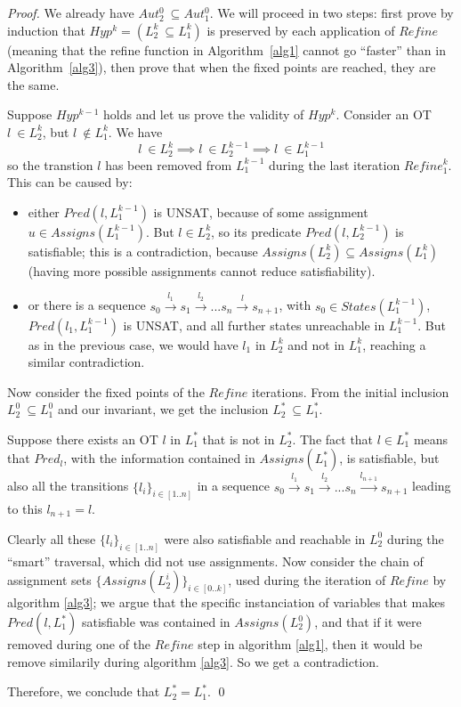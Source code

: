 \documentclass[smallcondensed]{svjour3}
\begin{document}
\begin{proof}
We already have $Aut_2^0\ \subseteq Aut_1^0$.
We will proceed in two steps:
first prove by induction that $Hyp^k = (L_2^k\ \subseteq L_1^k)$ is
preserved by each application of $Refine$ (meaning that the refine function
in Algorithm~\ref{alg1} cannot go ``faster'' than in Algorithm~\ref{alg3}), then prove
that when the fixed points are reached, they are the same. 

Suppose $Hyp^{k-1}$ holds and let us prove the validity of $Hyp^k$.
Consider an OT $l\ \in L_2^k$, but $l\ \notin L_1^k$.
We have \[ l\ \in L_2^k \implies l\ \in L_2^{k-1} \implies l\ \in
L_1^{k-1}\] so the transtion $l$ has been removed from $L_1^{k-1}$ during the last
iteration $Refine_1^k$. This can be caused by:
\begin{itemize}
\item
  either $Pred(l,L_1^{k-1})$ is UNSAT, because of some assignment
    $u \in Assigns(L_1^{k-1})$. But $l \in L_2^k$, so its predicate
    $Pred(l,L_2^{k-1})$ is satisfiable; this is a contradiction,
    because $Assigns(L_2^k) \subseteq Assigns(L_1^k)$ (having
    more possible assignments cannot reduce satisfiability).
  \item
    or there is a sequence
    $s_0\xrightarrow{l_1}s_1\xrightarrow{l_2}...s_{n}\xrightarrow{l}s_{n+1}$,
    with $s_0 \in States(L_1^{k-1})$, $Pred(l_1,L_1^{k-1})$ is UNSAT, and
    all further states unreachable in $L_1^{k-1}$. But as in the
    previous case, we would have $l_1$ in $L_2^k$ and not in $L_1^k$,
    reaching a similar contradiction.
\end{itemize}

\smallskip
Now consider the fixed points of the $Refine$ iterations. From the
initial inclusion $L_2^0\ \subseteq L_1^0$ and our invariant, we get the
inclusion  $L_2^*\ \subseteq L_1^*$.

Suppose there exists an OT $l$ in $L_1^*$ that is not in $L_2^*$.
The fact that $l \in L_1^*$ means that $Pred_l$, with the information contained in $Assigns(L_1^*)$, is satisfiable, but also all the transitions $\{l_i\}_{i \in [1..n]}$ in a sequence
$s_0\xrightarrow{l_1}s_1\xrightarrow{l_2}...s_{n}\xrightarrow{l_{n+1}}s_{n+1}$ leading to this $l_{n+1}=l$.

Clearly all these $\{l_i\}_{i \in [1..n]}$ were also satisfiable and reachable in $L_2^0$ during the ``smart'' traversal, which did not use assignments. Now consider the chain of assignment sets $\{Assigns(L_2^i)\}_{i \in [0..k]}$, used during the iteration of $Refine$ by algorithm \ref{alg3}; we argue that the specific instanciation of variables that makes $Pred(l,L_1^*)$ satisfiable was contained in $Assigns(L_2^0)$, and that if it were removed during one of the $Refine$ step in algorithm \ref{alg1}, then it would be remove similarily during algorithm \ref{alg3}. So we get a contradiction.


Therefore, we conclude that $L_2^* = L_1^*$.
\hfill\qed
\end{proof}
\end{document}
